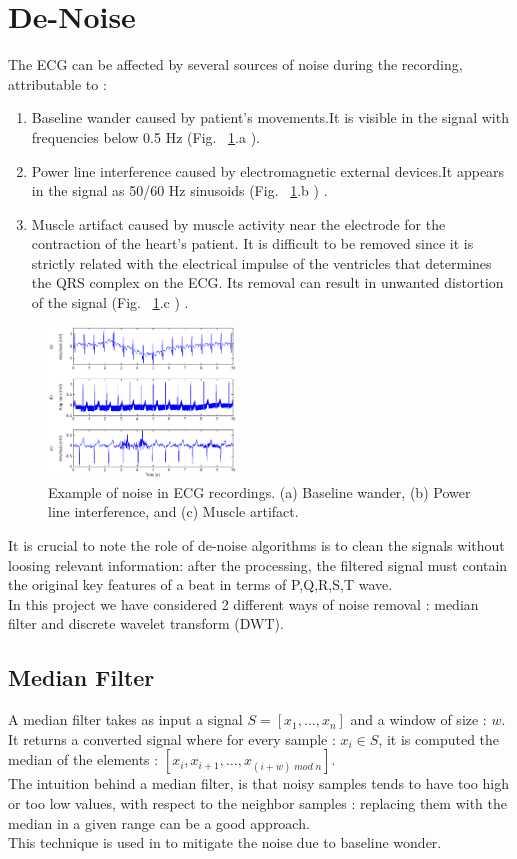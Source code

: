 \documentclass[LaM,binding=0.6cm]{sapthesis}
\begin{document}
\section{De-Noise}
The ECG  can be affected by several sources of noise during the recording, attributable to : 
\begin{enumerate}
\item Baseline wander caused by patient's movements.It is visible in the signal with frequencies below 0.5 Hz (Fig. ~\ref{fig:n1}.a ).
\item Power line interference caused by electromagnetic external devices.It appears in the signal as 50/60 Hz sinusoids (Fig. ~\ref{fig:n1}.b ) .
\item Muscle artifact caused by muscle activity near the electrode for the contraction of the heart's patient. It is difficult to be removed since it is strictly related with the electrical impulse of the ventricles that determines the QRS complex on the ECG. Its removal can result in unwanted distortion of the signal (Fig. ~\ref{fig:n1}.c ) .
\end{enumerate}
\begin{figure}[H]
	\includegraphics[width=50mm,scale=0.7]{noise.png}
	\caption{Example of noise in ECG recordings. (a) Baseline wander, (b) Power line interference, and (c) Muscle artifact. \cite{noise}}
	\label{fig:n1}
\end{figure}
It is crucial to note the role of de-noise algorithms is to clean the signals without loosing relevant information:  after the processing, the filtered signal must contain the original key features of a beat in terms of P,Q,R,S,T wave.\\In this project we have considered 2 different ways of noise removal : median filter and discrete wavelet transform (DWT).

\subsection{Median Filter}
A median filter takes as input a signal $S = [x_1 , \dots , x_n]$ and a window of size : $w$.\\It returns a converted signal where for every sample : $x_i \in S$, it is computed the median of the elements : $[x_i, x_{i+1}, \dots , x_{(i+w) \; mod \; n}]$.\\The intuition behind a median filter, is that noisy samples tends to have too high or too low values, with respect to the neighbor samples : replacing them with the median in a given range can be a good approach.\\This technique is used in \cite{rfdwt} to mitigate the noise due to baseline wonder.
\end{document}
